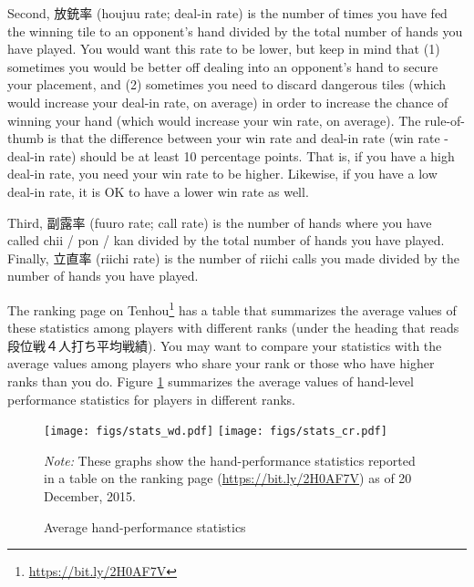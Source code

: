 \bigskip
Second, 放銃率 ({\jap houjuu} rate; deal-in rate) is the number of times you have fed the winning tile to an opponent's hand divided by the total number of hands you have played. You would want this rate to be lower, but keep in mind that (1) sometimes you would be better off dealing into an opponent's hand to secure your placement, and (2) sometimes you need to discard dangerous tiles (which would increase your deal-in rate, on average) in order to increase the chance of winning your hand (which would increase your win rate, on average). The rule-of-thumb is that the difference between your win rate and deal-in rate (win rate - deal-in rate) should be at least 10 percentage points. That is, if you have a high deal-in rate, you need your win rate to be higher. Likewise, if you have a low deal-in rate, it is OK to have a lower win rate as well. 

\bigskip
Third, 副露率 ({\jap fuuro} rate; call rate) is the number of hands where you have called {\jap chii} / {\jap pon} / {\jap kan} divided by the total number of hands you have played. Finally, 立直率 (riichi rate) is the number of riichi calls you made divided by the number of hands you have played. 

\bigskip

The ranking page on {\jap Tenhou}\footnote{\url{https://bit.ly/2H0AF7V}} has a table that summarizes the average values of these statistics among players with different ranks (under the heading that reads 段位戦４人打ち平均戦績). You may want to compare your statistics with the average values among players who share your rank or those who have higher ranks than you do. Figure \ref{fig:avg} summarizes the average values of hand-level performance statistics for players in different ranks. 
\newpage

\bigskip
\begin{figure}[t!] \captionsetup{font=small}
\begin{center}
\texttt{[image: figs/stats\_wd.pdf]}\hspace{-7pt}
\texttt{[image: figs/stats\_cr.pdf]}
\vspace{-10pt}
\caption{Average hand-performance statistics}\label{fig:avg}
\end{center}\vspace{-10pt}
{\footnotesize \textit{Note:} These graphs show the hand-performance statistics reported in a table on the ranking page (\url{https://bit.ly/2H0AF7V}) as of 20 December, 2015.}
\end{figure}

